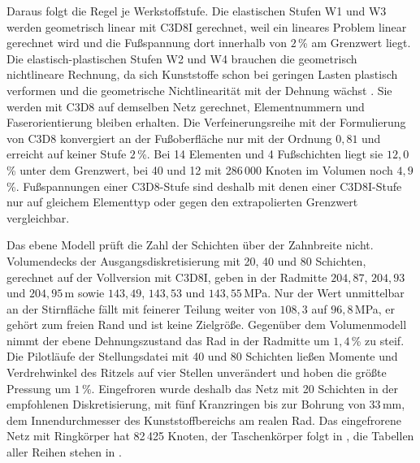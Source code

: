 Daraus folgt die Regel je Werkstoffstufe. Die elastischen Stufen W1 und W3 werden geometrisch linear mit C3D8I gerechnet, weil ein lineares Problem linear gerechnet wird \cite[S.~474]{Sto18} und die Fußspannung dort innerhalb von $2$\,\% am Grenzwert liegt. Die elastisch-plastischen Stufen W2 und W4 brauchen die geometrisch nichtlineare Rechnung, da sich Kunststoffe schon bei geringen Lasten plastisch verformen und die geometrische Nichtlinearität mit der Dehnung wächst \cite[S.~2, 52, 474]{Sto18}. Sie werden mit C3D8 auf demselben Netz gerechnet, Elementnummern und Faserorientierung bleiben erhalten. Die Verfeinerungsreihe mit der Formulierung von C3D8 konvergiert an der Fußoberfläche nur mit der Ordnung $0{,}81$ und erreicht auf keiner Stufe $2$\,\%. Bei 14 Elementen und 4 Fußschichten liegt sie $12{,}0$\,\% unter dem Grenzwert, bei 40 und 12 mit 286\,000 Knoten im Volumen noch $4{,}9$\,\%. Fußspannungen einer C3D8-Stufe sind deshalb mit denen einer C3D8I-Stufe nur auf gleichem Elementtyp oder gegen den extrapolierten Grenzwert vergleichbar.


Das ebene Modell prüft die Zahl der Schichten über der Zahnbreite nicht. Volumendecks der Ausgangsdiskretisierung mit 20, 40 und 80 Schichten, gerechnet auf der Vollversion mit C3D8I, geben in der Radmitte $204{,}87$, $204{,}93$ und $204{,}95$\,\textmu m sowie $143{,}49$, $143{,}53$ und $143{,}55$\,MPa. Nur der Wert unmittelbar an der Stirnfläche fällt mit feinerer Teilung weiter von $108{,}3$ auf $96{,}8$\,MPa, er gehört zum freien Rand und ist keine Zielgröße. Gegenüber dem Volumenmodell nimmt der ebene Dehnungszustand das Rad in der Radmitte um $1{,}4$\,\% zu steif. Die Pilotläufe der Stellungsdatei mit 40 und 80 Schichten ließen Momente und Verdrehwinkel des Ritzels auf vier Stellen unverändert und hoben die größte Pressung um $1$\,\%. Eingefroren wurde deshalb das Netz mit 20 Schichten in der empfohlenen Diskretisierung, mit fünf Kranzringen bis zur Bohrung von $33$\,mm, dem Innendurchmesser des Kunststoffbereichs am realen Rad. Das eingefrorene Netz mit Ringkörper hat 82\,425 Knoten, der Taschenkörper folgt in , die Tabellen aller Reihen stehen in .


